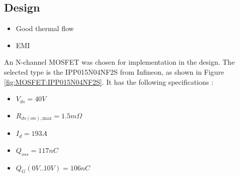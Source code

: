 \subsection{Design}
\begin{itemize}
    \item Good thermal flow
    \item EMI
\end{itemize}


An N-channel MOSFET was chosen for implementation in the design. The selected type is the IPP015N04NF2S from Infineon, as shown in Figure \ref{fig:MOSFET:IPP015N04NF2S}. It has the following specifications \cite{Datasheet-MOSFET-IPP015N04NF2S} :
\begin{itemize}
    \item $V_{ds} = 40 V$
    \item $R_{ds(on),\text{max}} = 1.5 m\Omega$
    \item $I_{d} = 193 A$
    \item $Q_{oss} = 117 nC$
    \item $Q_{G}(0V..10V) = 106 nC$
\end{itemize}


